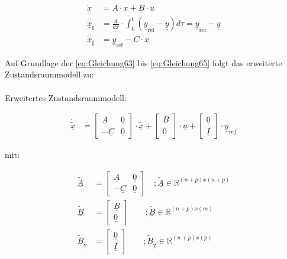 \begin{align}
    \underline{\dot{x}} &= \underline{A}\cdot\underline{x}+\underline{B}\cdot\underline{u} \label{eq:Gleichung64}\\
    \underline{\dot{x}}_{\mathrm{I}} &= \frac{d}{dx}\cdot\int_{0}^t(\underline{y}_{\mathrm{ref}}-\underline{y})d\tau = \underline{y}_{\mathrm{ref}}-\underline{y} \nonumber \\
    \underline{\dot{x}}_{\mathrm{I}} &= \underline{y}_{\mathrm{ref}}-\underline{C}\cdot\underline{x} \label{eq:Gleichung65}
\end{align}

Auf Grundlage der \autoref{eq:Gleichung63} bis \autoref{eq:Gleichung65} folgt das erweiterte Zustandsraummodell zu:\\\\
Erweitertes Zustandsraummodell:

\begin{align}\label{eq:Gleichung66}
    \underline{\dot{\tilde{x}}} &= 
    \begin{bmatrix}
        \underline{A} & \underline{0} \\
        -\underline{C} & \underline{0}
    \end{bmatrix} \cdot \underline{\tilde{x}} +
    \begin{bmatrix}
        \underline{B} \\
        \underline{0}
    \end{bmatrix} \cdot\underline{u} +
    \begin{bmatrix}
        \underline{0} \\
        \underline{I}
    \end{bmatrix} \cdot\underline{y}_{ref}
\end{align}

mit:

\begin{align*}
    \underline{\tilde{A}} &= 
    \begin{bmatrix}
        \underline{A} & \underline{0} \\
        -\underline{C} & \underline{0}
    \end{bmatrix} \quad ; \underline{\tilde{A}}\in\mathbb{R}^{(n+p)x(n+p)}\\
    \underline{\tilde{B}} &= 
    \begin{bmatrix}
        \underline{B} \\
        \underline{0}
    \end{bmatrix}\qquad ; \underline{\tilde{B}}\in\mathbb{R}^{(n+p)x(m)}\\
    \underline{\tilde{B}}_{\mathrm{y}} &= 
    \begin{bmatrix}
        \underline{0} \\
        \underline{I}
    \end{bmatrix}\qquad  ;\underline{\tilde{B}}_{\mathrm{y}}\in\mathbb{R}^{(n+p)x(p)}
\end{align*}

